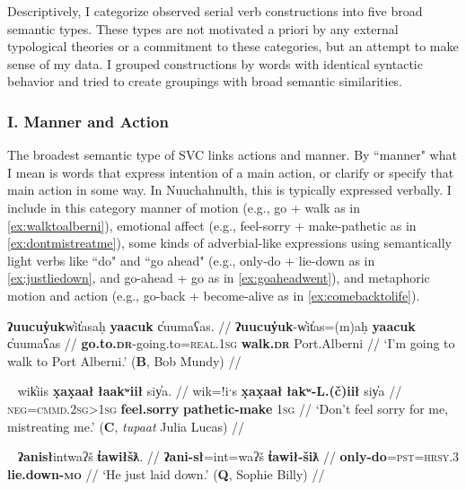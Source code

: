 Descriptively, I categorize observed serial verb constructions into five broad semantic types. These types are not motivated a priori by any external typological theories or a commitment to these categories, but an attempt to make sense of my data. I grouped constructions by words with identical syntactic behavior and tried to create groupings with broad semantic similarities.

\vspace{10pt}

\subsubsection{I. Manner and Action} \label{sec:svc:mannerandaction}

\vspace{10pt}

The broadest semantic type of SVC links actions and manner. By ``manner" what I mean is words that express intention of a main action, or clarify or specify that main action in some way. In Nuuchahnulth, this is typically expressed verbally. I include in this category manner of motion (e.g., go + walk as in \ref{ex:walktoalberni}), emotional affect (e.g., feel-sorry + make-pathetic as in \ref{ex:dontmistreatme}), some kinds of adverbial-like expressions using semantically light verbs like ``do" and ``go ahead" (e.g., only-do + lie-down as in \ref{ex:justliedown}, and go-ahead + go as in \ref{ex:goaheadwent}), and metaphoric motion and action (e.g., go-back + become-alive as in \ref{ex:comebacktolife}).

\ex \label{ex:walktoalberni}
\begingl
\glpreamble \textbf{ʔuucuy̓uk}w̓it̓asaḥ \textbf{yaacuk} c̓uumaʕas. //
\gla \textbf{ʔuucuy̓uk}-w̓it̓as=(m)aḥ \textbf{yaacuk} c̓uumaʕas //
\glb \textbf{go.to.\textsc{dr}}-going.to=\textsc{real.1sg} \textbf{walk.\textsc{dr}} Port.Alberni //
\glft `I'm going to walk to Port Alberni.' (\textbf{B}, Bob Mundy) //
\endgl
\xe

\ex~ \label{ex:dontmistreatme}
\begingl
\glpreamble wik̓iis \textbf{x̣ax̣aał} \textbf{łaakʷiił} siy̓a. //
\gla wik=!iˑs \textbf{x̣ax̣aał} \textbf{łakʷ-L.(č)iił} siy̓a //
\glb \textsc{neg}=\textsc{cmmd.2sg>1sg} \textbf{feel.sorry} \textbf{pathetic-make} \textsc{1sg} //
\glft `Don't feel sorry for me, mistreating me.' (\textbf{C}, \textit{tupaat} Julia Lucas) //
\endgl
\xe

\ex~ \label{ex:justliedown}
\begingl
\glpreamble \textbf{ʔanisł}intwaʔš \textbf{t̓awiłšƛ}. //
\gla \textbf{ʔani-sł}=int=waʔš \textbf{t̓awił-šiƛ} //
\glb \textbf{only-do}=\textsc{pst}=\textsc{hrsy.3} \textbf{lie.down-\textsc{mo}} //
\glft `He just laid down.' (\textbf{Q}, Sophie Billy) //
\endgl
\xe

